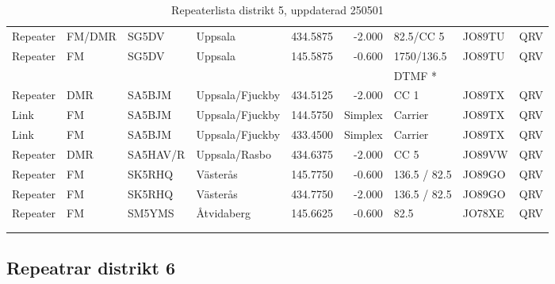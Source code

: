 \begin{longtable}{llllrrlll}
Repeater & FM/DMR     & SG5DV    & Uppsala           & 434.5875     & -2.000     & 82.5/CC 5       & JO89TU      & QRV      \\
Repeater & FM         & SG5DV    & Uppsala           & 145.5875     & -0.600     & 1750/136.5      & JO89TU      & QRV      \\
         &            &          &                   &              &            & DTMF *          &             &          \\
Repeater & DMR        & SA5BJM   & Uppsala/Fjuckby   & 434.5125     & -2.000     & CC 1            & JO89TX      & QRV      \\
Link     & FM         & SA5BJM   & Uppsala/Fjuckby   & 144.5750     & Simplex    & Carrier         & JO89TX      & QRV      \\
Link     & FM         & SA5BJM   & Uppsala/Fjuckby   & 433.4500     & Simplex    & Carrier         & JO89TX      & QRV      \\
Repeater & DMR        & SA5HAV/R & Uppsala/Rasbo     & 434.6375     & -2.000     & CC 5            & JO89VW      & QRV      \\
Repeater & FM         & SK5RHQ   & Västerås          & 145.7750     & -0.600     & 136.5 / 82.5    & JO89GO      & QRV      \\
Repeater & FM         & SK5RHQ   & Västerås          & 434.7750     & -2.000     & 136.5 / 82.5    & JO89GO      & QRV      \\
Repeater & FM         & SM5YMS   & Åtvidaberg        & 145.6625     & -0.600     & 82.5            & JO78XE      & QRV      \\
\vspace{1 ex}                                                                                                               \\
\caption{Repeaterlista distrikt 5, uppdaterad 250501}                                                                       \\
\end{longtable}

\clearpage

\subsection{Repeatrar distrikt 6}

